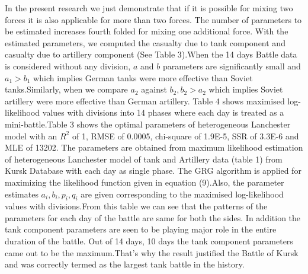 \documentclass[]{article}
\begin{document}
	In the present research we just demonstrate that if it is possible for mixing two forces it is also applicable for more than two forces. The number of parameters to be estimated increases fourth folded for mixing one additional force. With the estimated parameters, we computed the casualty due to tank component and casualty due to artillery component (See Table 3).When the 14 days Battle data is considered without any division, $a$ and $b$ parameters are significantly small and $a_1>b_1$ which implies German tanks were more effective than Soviet tanks.Similarly, when we compare $a_2$ against $b_2, b_2>a_2$ which implies Soviet artillery were more effective than German artillery. 
Table 4 shows maximised log-likelihood values with divisions into 14 phases where each day is treated as a mini-battle.Table 3 shows the optimal parameters of heterogeneous Lanchester model with an $R^2$ of 1, RMSE of 0.0005, chi-square of 1.9E-5, SSR of 3.3E-6 and MLE of 13202. The parameters are obtained from maximum likelihood estimation of heterogeneous Lanchester model of tank and Artillery data (table 1) from Kursk Database with each day as single phase. The GRG algorithm is applied for maximizing the likelihood function given in equation (9).Also, the parameter estimates $a_i, b_i, p_i, q_i$ are given corresponding to the maximised log-likelihood values with divisions.From this table we can see that the patterns of the parameters for each day of the battle are same for both the sides. In addition the tank component  parameters are seen to be playing major role in the entire duration of the battle. Out of 14 days, 10 days the tank component parameters came out to be the maximum.That’s why the result justified the Battle of Kursk and was correctly termed as the largest tank battle in the history.
\newpage
\end{document}
